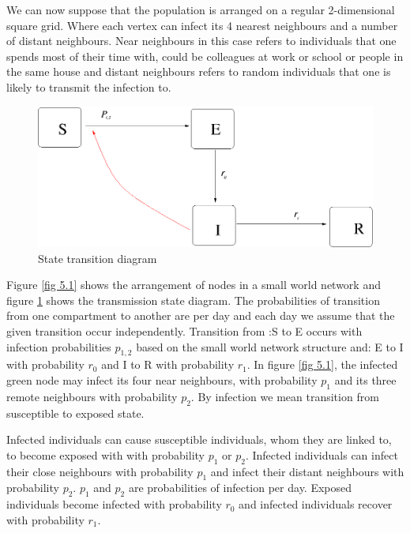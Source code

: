 We  can now suppose that the population is arranged on a regular
2-dimensional square grid.  Where each vertex can infect its 4 nearest neighbours and a number of distant neighbours. Near neighbours in this case refers to individuals that one spends most of their time with, could be colleagues at work or school or people in the same house and distant neighbours refers to random individuals that one is likely to transmit the infection to. 
 
 \begin{figure}[h]
 \centering
 \includegraphics[scale=0.5]{images/swseir.png}
 \caption{State transition diagram} \label{fig 5.2}
\end{figure}

 
Figure \ref{fig 5.1} shows the arrangement of nodes in a small world network and figure \ref{fig 5.2} shows the transmission state diagram. The probabilities of transition from one compartment to another are per day and each day we assume that the given transition occur independently. Transition from :S to E
occurs
with infection probabilities $p_ {1,2} $ based on the small world network structure and: E to I with probability $r_0$ and I to R with probability $r_1$. In figure \ref{fig 5.1}, the infected green node may infect its four near neighbours, with probability $p_1$ and its three remote neighbours with probability $p_2$. By infection we mean transition from susceptible to exposed state. 

Infected individuals can cause susceptible individuals, whom they are linked to, to become exposed with with probability $p_1$ or $p_2$. Infected individuals can  infect their close neighbours with  probability $p_1$ and infect their distant neighbours with probability $p_2$. $p_1 $ and $p_2$ are probabilities of infection per day. Exposed individuals become infected with probability $r_0$ and infected individuals recover with probability $r_1$.

